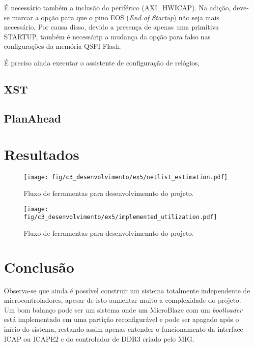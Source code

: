 \documentclass[11pt,a4paper,oneside]{book}
\begin{document}
É necessário também a inclusão do periférico  (AXI\_HWICAP).
Na adição, deve-se marcar a opção  para que o pino EOS (\textit{End of Startup}) não seja mais necessário.
Por causa disso, devido a presença de apenas uma primitiva STARTUP, também é necessárip a mudança da opção  para falso nas configurações da memória QSPI Flash.

É preciso ainda executar o assistente de configuração de relógios, 

\subsection{XST}

\subsection{PlanAhead}

\section{Resultados}

\begin{figure}[htp]
\centering
\texttt{[image: fig/c3\_desenvolvimento/ex5/netlist\_estimation.pdf]}
\caption{Fluxo de ferramentas para desenvolvimennto do projeto.}
\label{fig:ex5:prsoftwareflow}
\end{figure}

\begin{figure}[htp]
\centering
\texttt{[image: fig/c3\_desenvolvimento/ex5/implemented\_utilization.pdf]}
\caption{Fluxo de ferramentas para desenvolvimennto do projeto.}
\label{fig:ex5:prsoftwareflow}
\end{figure}

\section{Conclusão}

Observa-se que ainda é possível construir um sistema totalmente independente de microcontroladores, apesar de isto aumentar muito a complexidade do projeto.
Um bom balanço pode ser um sistema onde um MicroBlaze com um \textit{bootloader} está implementado em uma partição reconfigurável e pode ser apagado após o início do sistema, restando assim apenas entender o funcionamento da interface ICAP ou ICAPE2 e do controlador de DDR3 criado pelo MIG.

\ifx\compilewholereport\undefined
	
	\newsavebox\mytempbib\savebox\mytempbib{\parbox{\textwidth}{}}

	\listoftodos
	
\end{document}
